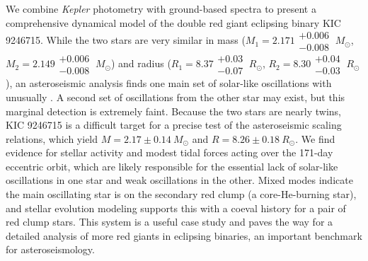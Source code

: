 We combine \emph{Kepler} photometry with ground-based spectra to present a comprehensive dynamical model of the double red giant eclipsing binary KIC 9246715. While the two stars are very similar in mass ($M_1 = 2.171\substack{+0.006 \\ -0.008} \ M_{\odot}$, $M_2 = 2.149\substack{+0.006 \\ -0.008} \ M_{\odot}$) and radius ($R_1 = 8.37\substack{+0.03 \\ -0.07} \ R_{\odot}$, $R_2 = 8.30\substack{+0.04 \\ -0.03} \ R_{\odot}$), an asteroseismic analysis finds one main set of solar-like oscillations with unusually . A second set of oscillations from the other star may exist, but this marginal detection is extremely faint. Because the two stars are nearly twins, KIC 9246715 is a difficult target for a precise test of the asteroseismic scaling relations, which yield $M = 2.17\pm0.14 \ M_{\odot}$ and $R = 8.26\pm0.18 \ R_{\odot}$.  We find evidence for stellar activity and modest tidal forces acting over the 171-day eccentric orbit, which are likely responsible for the essential lack of solar-like oscillations in one star and weak oscillations in the other. Mixed modes indicate the main oscillating star is on the secondary red clump (a core-He-burning star), and stellar evolution modeling supports this with a coeval history for a pair of red clump stars. This system is a useful case study and paves the way for a detailed analysis of more red giants in eclipsing binaries, an important benchmark for asteroseismology.
  